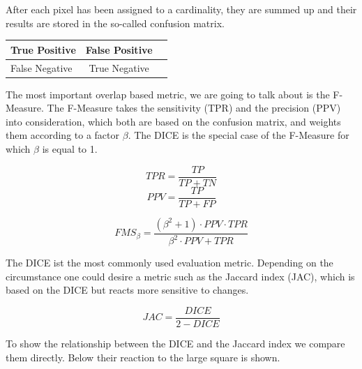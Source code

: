 \documentclass[journal]{IEEEtran}
\begin{document}
\hspace{1in}

After each pixel has been assigned to a cardinality, they are summed up and their results are stored in the so-called confusion matrix.

\begin{center}
	\begin{tabular}{|l| c |r| }
		\hline
		True Positive & False Positive \\ \hline
		False Negative & True Negative \\
		\hline
	\end{tabular}
\end{center}

The most important overlap based metric, we are going to talk about is the F- Measure. The F-Measure takes the sensitivity (TPR) and the precision (PPV) into consideration, which both are based on the confusion matrix, and weights them according to a factor \(\beta\). The DICE is the special case of the F-Measure for which \( \beta \) is equal to 1. 

\begin{multicols}{2}	%
	\begin{equation}
		TPR = \frac{TP}{TP+TN} 
	\end{equation} 
	\break
	\begin{equation}
		PPV = \frac{TP}{TP + FP} 
	\end{equation}
\end{multicols}

\begin{equation}	%
	FMS_{\beta} = \frac{(\beta^2+1) \cdot PPV \cdot TPR}{ \beta^2 \cdot PPV + TPR}
\end{equation}

\hspace{2in}

The DICE ist the most commonly used evaluation metric. Depending on the circumstance one could desire a metric such as the Jaccard index (JAC), which is based on the DICE but reacts more sensitive to changes.

\begin{equation} %
JAC = \frac{DICE}{2-DICE}
\end{equation}

To show the relationship between the DICE and the Jaccard index we compare them directly. Below their reaction to the large square is shown.
\end{document}

